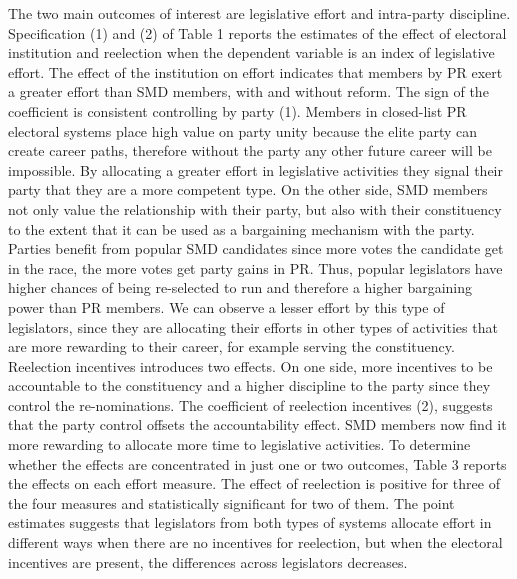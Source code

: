 \documentclass{article}
\begin{document}
The two main outcomes of interest are legislative effort and intra-party discipline. Specification (1) and (2) of Table 1 reports the estimates of the effect of electoral institution and reelection when the dependent variable is an index of legislative effort. The effect of the institution on effort indicates that members by PR exert a greater effort than SMD members, with and without reform. The sign of the coefficient is consistent controlling by party (1). Members in closed-list PR electoral systems place high value on  party unity because the elite party  can create career paths, therefore without the party any other future career will be impossible. By allocating a greater effort in legislative activities they signal their party that they are a more competent type. On the other side, SMD members not only value the relationship with their party, but also with their constituency to the extent that it can be used as a bargaining mechanism with the party. Parties benefit from popular SMD candidates since more votes the candidate get in the race, the more votes get party gains in PR. Thus, popular legislators have higher chances of being re-selected to run and therefore a higher bargaining power than PR members. We can observe a lesser effort by this type of legislators, since they are allocating their efforts in other types of activities that are more rewarding to their career, for example serving the constituency. Reelection incentives introduces two effects. On one side, more incentives to be accountable to the constituency and a higher discipline to the party since they control the re-nominations. The coefficient of reelection incentives (2), suggests that the party control offsets the accountability effect. SMD members now find it more rewarding to allocate more time to legislative activities. To determine whether the effects are concentrated in just one or two outcomes, Table 3 reports the effects on each effort measure. The effect of reelection is positive for three of the four measures and statistically significant for two of them. The point estimates suggests that legislators from both types of systems allocate effort in  different ways when there are no incentives for reelection, but when the electoral incentives are present, the differences across legislators decreases. \\
\\
\end{document}
